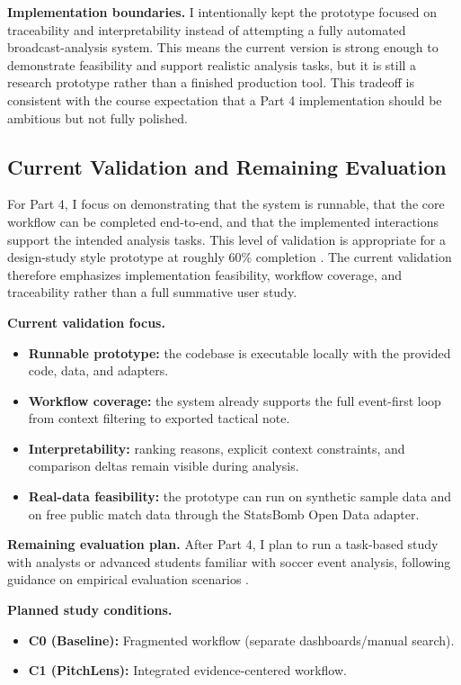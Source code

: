 \documentclass{vgtc}                          %
\begin{document}
\noindent\textbf{Implementation boundaries.}
I intentionally kept the prototype focused on traceability and interpretability instead of attempting a fully automated broadcast-analysis system. This means the current version is strong enough to demonstrate feasibility and support realistic analysis tasks, but it is still a research prototype rather than a finished production tool. This tradeoff is consistent with the course expectation that a Part 4 implementation should be ambitious but not fully polished.

\subsection{Current Validation and Remaining Evaluation}
For Part 4, I focus on demonstrating that the system is runnable, that the core workflow can be completed end-to-end, and that the implemented interactions support the intended analysis tasks. This level of validation is appropriate for a design-study style prototype at roughly 60\% completion \cite{Lam2012Evaluation,Sedlmair2012DesignStudy}. The current validation therefore emphasizes implementation feasibility, workflow coverage, and traceability rather than a full summative user study.

\noindent\textbf{Current validation focus.}
\begin{itemize}[leftmargin=*]
\item \textbf{Runnable prototype:} the codebase is executable locally with the provided code, data, and adapters.
\item \textbf{Workflow coverage:} the system already supports the full event-first loop from context filtering to exported tactical note.
\item \textbf{Interpretability:} ranking reasons, explicit context constraints, and comparison deltas remain visible during analysis.
\item \textbf{Real-data feasibility:} the prototype can run on synthetic sample data and on free public match data through the StatsBomb Open Data adapter.
\end{itemize}

\noindent\textbf{Remaining evaluation plan.}
After Part 4, I plan to run a task-based study with analysts or advanced students familiar with soccer event analysis, following guidance on empirical evaluation scenarios \cite{Lam2012Evaluation}.

\noindent\textbf{Planned study conditions.}
\begin{itemize}[leftmargin=*]
\item \textbf{C0 (Baseline):} Fragmented workflow (separate dashboards/manual search).
\item \textbf{C1 (PitchLens):} Integrated evidence-centered workflow.
\end{itemize}
\end{document}
